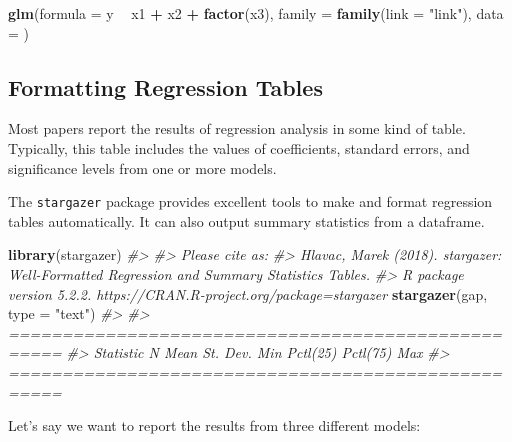 \documentclass[
]{book}
\newenvironment{Shaded}{\begin{snugshade}}{\end{snugshade}}
\newcommand{\CommentTok}[1]{\textcolor[rgb]{0.56,0.35,0.01}{\textit{#1}}}
\newcommand{\DataTypeTok}[1]{\textcolor[rgb]{0.13,0.29,0.53}{#1}}
\newcommand{\KeywordTok}[1]{\textcolor[rgb]{0.13,0.29,0.53}{\textbf{#1}}}
\newcommand{\NormalTok}[1]{#1}
\newcommand{\OperatorTok}[1]{\textcolor[rgb]{0.81,0.36,0.00}{\textbf{#1}}}
\newcommand{\StringTok}[1]{\textcolor[rgb]{0.31,0.60,0.02}{#1}}
\begin{document}
\begin{Shaded}
\begin{Highlighting}[]
\KeywordTok{glm}\NormalTok{(}\DataTypeTok{formula =}\NormalTok{ y }\OperatorTok{~}\StringTok{ }\NormalTok{x1 }\OperatorTok{+}\StringTok{ }\NormalTok{x2 }\OperatorTok{+}\StringTok{ }\KeywordTok{factor}\NormalTok{(x3), }\DataTypeTok{family =} \KeywordTok{family}\NormalTok{(}\DataTypeTok{link =} \StringTok{"link"}\NormalTok{),}
            \DataTypeTok{data =}\NormalTok{ )}
\end{Highlighting}
\end{Shaded}

\hypertarget{formatting-regression-tables}{%
\subsection{Formatting Regression Tables}\label{formatting-regression-tables}}

Most papers report the results of regression analysis in some kind of table. Typically, this table includes the values of coefficients, standard errors, and significance levels from one or more models.

The \texttt{stargazer} package provides excellent tools to make and format regression tables automatically. It can also output summary statistics from a dataframe.

\begin{Shaded}
\begin{Highlighting}[]
\KeywordTok{library}\NormalTok{(stargazer)}
\CommentTok{#> }
\CommentTok{#> Please cite as:}
\CommentTok{#>  Hlavac, Marek (2018). stargazer: Well-Formatted Regression and Summary Statistics Tables.}
\CommentTok{#>  R package version 5.2.2. https://CRAN.R-project.org/package=stargazer}
\KeywordTok{stargazer}\NormalTok{(gap, }\DataTypeTok{type =} \StringTok{"text"}\NormalTok{)}
\CommentTok{#> }
\CommentTok{#> ===================================================}
\CommentTok{#> Statistic N Mean St. Dev. Min Pctl(25) Pctl(75) Max}
\CommentTok{#> ===================================================}
\end{Highlighting}
\end{Shaded}

Let's say we want to report the results from three different models:
\end{document}
